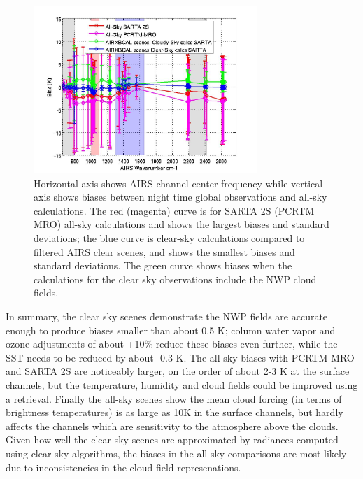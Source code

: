 \documentclass[agupp]{aguplus}              %
\begin{document}
\begin{article}
\begin{figure}[h]
\noindent\includegraphics[width=20pc]{FIGSORIG_Dec2013/ecm_allsky_41chan_biasNstdV2.jpg}
\caption{Horizontal axis shows AIRS channel center frequency while
vertical axis shows biases between night time global observations and all-sky
calculations.  The red (magenta) curve is for SARTA 2S (PCRTM MRO) 
all-sky calculations and shows the largest biases and standard deviations;
the blue curve is clear-sky calculations compared to filtered AIRS
clear scenes, and shows the smallest biases and standard deviations. 
The green curve shows biases when the calculations for the clear sky observations include
the NWP cloud fields.}
\label{ecm_allsky_41chan_biasNstd} 
\end{figure}

In summary, the clear sky scenes demonstrate the NWP fields are
accurate enough to produce biases smaller than about 0.5 K; column
water vapor and ozone adjustments of about +10\% reduce these biases
even further, while the SST needs to be reduced by about -0.3 K. The
all-sky biases with PCRTM MRO and SARTA 2S are noticeably larger, on
the order of about 2-3 K at the surface channels, but the temperature,
humidity and cloud fields could be improved using a retrieval. Finally
the all-sky scenes show the mean cloud forcing (in terms of brightness
temperatures) is as large as 10K in the surface channels, but hardly
affects the channels which are sensitivity to the atmosphere above the
clouds. Given how well the clear sky scenes are approximated by
radiances computed using clear sky algorithms, the biases in the
all-sky comparisons are most likely due to inconsistencies in the
cloud field represenations.


\end{article}
\end{document}
